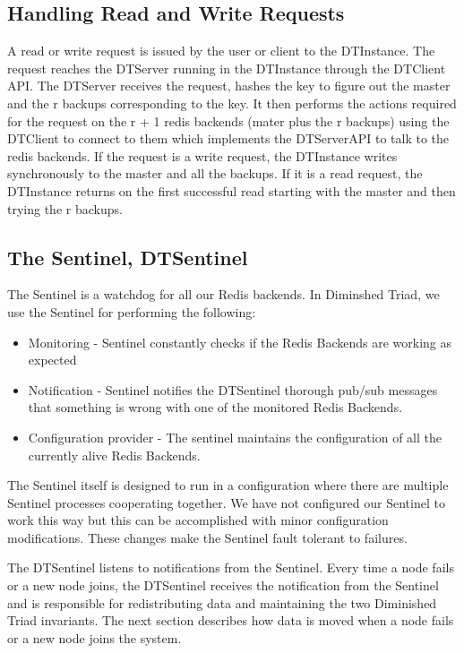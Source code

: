 \documentclass[10pt,twocolumn,letterpaper]{article}
\begin{document}
\subsection{Handling Read and Write Requests}
A read or write request is issued by the user or client to the DTInstance. The request reaches the DTServer running in the DTInstance through the DTClient API. The DTServer receives the request, hashes the key to figure out the master and the r backups corresponding to the key. It then performs the actions required for the request on the  r + 1 redis backends (mater plus the r backups) using the DTClient to connect to them which implements the DTServerAPI to talk to the redis backends. If the request is a write request, the DTInstance writes synchronously to the master and all the backups. If it is a read request, the DTInstance returns on the first successful read starting with the master and then trying the r backups.


\subsection{The Sentinel, DTSentinel}
The Sentinel is a watchdog for all our Redis backends. In Diminshed Triad, we use the Sentinel for performing the following:
\begin{itemize}
  \item Monitoring - Sentinel constantly checks if the Redis Backends are working as expected
  \item Notification - Sentinel notifies the DTSentinel thorough pub/sub messages that something is wrong with one of the monitored Redis Backends.
  \item Configuration provider - The sentinel maintains the configuration of all the currently alive Redis Backends.
\end{itemize}

The Sentinel itself is designed to run in a configuration where there are multiple Sentinel processes cooperating together. We have not configured our Sentinel to work this way but this can be accomplished with minor configuration modifications. These changes make the Sentinel fault tolerant to failures. 

The DTSentinel listens to notifications from the Sentinel. Every time a node fails or a new node joins, the DTSentinel receives the notification from the Sentinel and is responsible for redistributing data and maintaining the two Diminished Triad invariants. The next section describes how data is moved when a node fails or a new node joins the system.
\end{document}
